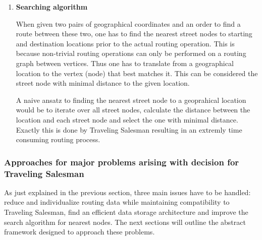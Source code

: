 \begin{enumerate}
	\item \textbf{Searching algorithm}
	
		When given two pairs of geographical coordinates and an order to find a route between these two, one has to find the nearest street nodes to starting and destination locations prior to the actual routing operation. This is because non-trivial routing operations can only be performed on a routing graph between vertices. Thus one has to translate from a geographical location to the vertex (node) that best matches it. This can be considered the street node with minimal distance to the given location.\newline
				
		A naive ansatz to finding the nearest street node 	to a geoprahical location would be to iterate over all street nodes, calculate the distance between the location and each street node and select the one with minimal distance. Exactly this is done by Traveling Salesman resulting in an extremly time consuming routing process.\newline

\end{enumerate}


\subsubsection{Approaches for major problems arising with decision for Traveling Salesman}
\label{sec:routing_mobiletsm_approaches}

As just explained in the previous section, three main issues have to be handled: reduce and individualize routing data while maintaining compatibility to Traveling Salesman, find an efficient data storage architecture and improve the search algorithm for nearest nodes. The next sections will outline the abstract framework designed to approach these problems.


